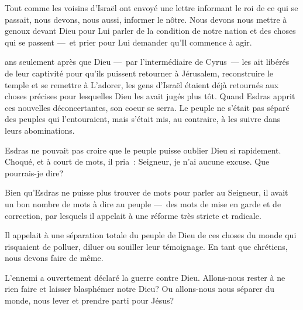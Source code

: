 Tout comme les voisins d'Israël ont envoyé une lettre informant
 le roi de ce qui se passait, nous devons, nous aussi, informer le nôtre.
 Nous devons nous mettre à genoux devant Dieu pour Lui parler de la condition
 de notre nation et des choses qui se passent ---~et prier pour Lui demander
 qu'Il commence à agir. 

\dvrule







 ans seulement après que Dieu
 ---~par l'intermédiaire de Cyrus~--- les ait libérés de leur captivité
 pour qu'ils puissent retourner à Jérusalem,
 reconstruire le temple et se remettre à L'adorer,
 les gens d'Israël étaient déjà retournés aux choses précises
 pour lesquelles Dieu les avait jugés plus tôt.
 Quand Esdras apprit ces nouvelles déconcertantes, son coeur se serra.
 Le peuple ne s'était pas séparé des peuples qui l'entouraient,
 mais s'était mis, au contraire, à les suivre dans leurs abominations.

Esdras ne pouvait pas croire que le peuple puisse oublier Dieu si rapidement.
 Choqué, et à court de mots, il pria~: \og Seigneur, je n'ai aucune excuse.
 Que pourrais-je dire? \fg{}

Bien qu'Esdras ne puisse plus trouver de mots pour parler au Seigneur,
 il avait un bon nombre de mots à dire au peuple ---~des mots de mise en garde
 et de correction, par lesquels il appelait à une réforme très stricte
 et radicale.

Il appelait à une séparation totale du peuple de Dieu de ces choses du monde
 qui risquaient de polluer, diluer ou souiller leur témoignage.
 En tant que chrétiens, nous devons faire de même. 



L'ennemi a ouvertement déclaré la guerre contre Dieu.
 Allons-nous rester à ne rien faire et laisser blasphémer notre Dieu?
 Ou allons-nous nous séparer du monde, nous lever et prendre parti pour Jésus? 


